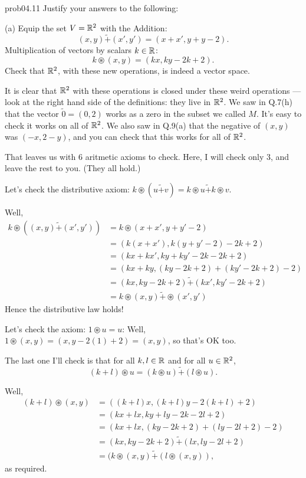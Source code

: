 \begin{sol}{prob04.11} Justify your answers to the following:

\medskip

(a)  Equip the set $V=\mathbb{R}^2$ with the  Addition: $$(x,y) \tilde+ (x',y')=(x+x', y+y-2).$$ Multiplication of vectors  by  scalars $k\in \mathbb{R}$: $$k \circledast (x,y)=(kx, ky-2k+2).$$  Check that  $\mathbb{R}^2$, with these new operations, is indeed a vector space. 

\soln It is clear that $\mathbb{R}^2$ with these operations is closed under these weird operations ---look at the right hand side of the definitions: they live in $\mathbb{R}^2$. We saw in Q.7(h) that the vector $\tilde 0=(0,2)$ works as a zero in the subset we called $M$. It's easy to check it works on all of $\mathbb{R}^2$. We also saw in Q.9(a) that the negative of $(x,y)$ was $(-x, 2-y)$, and you can check that this works for all of $\mathbb{R}^2$. 

That leaves us with 6 aritmetic  axioms to check. Here, I will check only 3, and leave the rest to you. (They all hold.)

Let's check the distributive axiom:  $k\circledast (u \tilde+ v)  = k\circledast u \tilde+ k\circledast v$. 

Well,
\begin{align*} 
k\circledast ((x,y) \tilde+ (x',y'))  &=k\circledast(x+x', y+y'-2)\\
&=(k(x+x'), k(y+y'-2)-2k+2)\\ 
&=(kx+ k x', ky+ky'-2k-2k+2)\\
&=(kx +ky, (ky -2k +2)+ (ky' -2k +2)-2)\\
&=(kx, ky -2k +2) \tilde+(kx', ky' -2k +2)\\
&=k\circledast (x,y) \tilde+ \circledast (x',y')
\end{align*}
Hence the distributive law holds! 

Let's check the axiom: $1\circledast u=u$: Well, $1\circledast (x,y)=(x, y -2(1) +2)=(x,y)$, so that's OK too.

The last one I'll check is that for all $k,l\in \mathbb{R}$ and for all $u\in \mathbb{R}^2$,   $$(k+l)\circledast u= (k\circledast u)\tilde+ (l \circledast u).$$

Well,  \begin{align*} (k+l)\circledast (x,y)  &=((k+l)x, (k+l)y -2(k+l)+2)\\
&=(kx+ lx , ky+ly-2k-2l+2)\\ 
&= (kx +lx,(ky-2k+2)+(ly-2l+2)-2)\\ 
&= (kx, ky-2k+2)\tilde+ (lx, ly-2l+2)\\
&= (k\circledast (x,y)\tilde+ (l \circledast (x,y)),\end{align*}
as required.
\end{sol} 